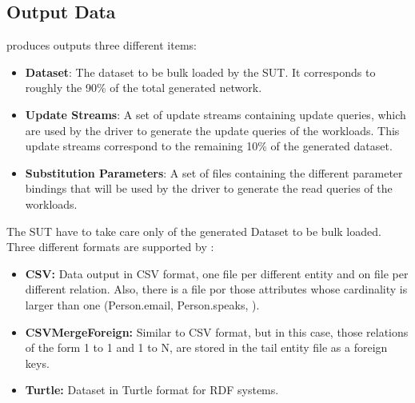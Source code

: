 %
%

\subsection{Output Data}

\datagen produces outputs three different items:
\begin{itemize}
  \item \textbf{Dataset}: The dataset to be bulk loaded by the SUT. It
    corresponds to roughly the 90\% of the total generated network.
  \item \textbf{Update Streams}: A set of update streams containing update
    queries, which are used by the driver to generate the update queries of the
    workloads. This update
    streams correspond to the remaining 10\% of the generated dataset.
  \item \textbf{Substitution Parameters}: A set of files containing the
    different parameter bindings that will be used by the driver to generate the
    read queries of the workloads.
\end{itemize}

The SUT have to take care only of the generated Dataset to be bulk loaded.
Three different formats are supported by \datagen:

\begin{itemize}
  \item \textbf{CSV:} Data output in CSV format, one file per different entity and on file
    per different relation. Also, there is a file por those attributes whose
    cardinality is larger than one (\ie Person.email, Person.speaks, \etc).
  \item \textbf{CSVMergeForeign:} Similar to CSV format, but in this case, those
    relations of the form 1 to 1 and 1 to N, are stored in the tail entity file as
    a foreign keys.
  \item \textbf{Turtle:} Dataset in Turtle format for RDF systems.
\end{itemize}



